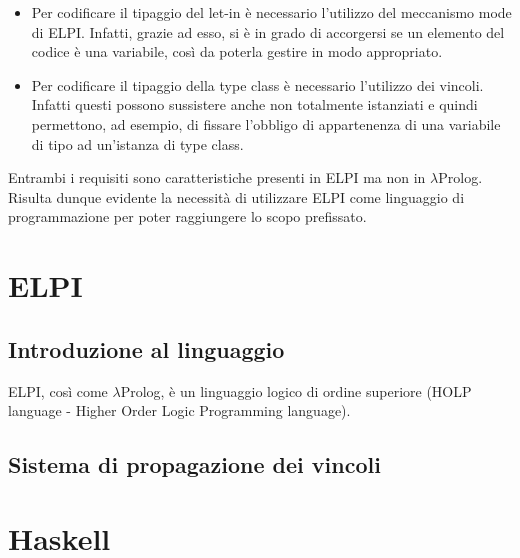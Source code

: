 \documentclass[12pt,a4paper,openright,twoside]{report}
\begin{document}
\begin{itemize}
 \item Per codificare il tipaggio del let-in è necessario l'utilizzo del meccanismo mode di ELPI. Infatti, grazie ad esso, si è in grado di accorgersi se un elemento del codice è una variabile, così da poterla gestire in modo appropriato.
 \item Per codificare il tipaggio della type class è necessario l'utilizzo dei vincoli. Infatti questi possono sussistere anche non totalmente istanziati e quindi permettono, ad esempio, di fissare l'obbligo di appartenenza di una variabile di tipo ad un'istanza di type class.
\end{itemize}
Entrambi i requisiti sono caratteristiche presenti in ELPI ma non in $\lambda$Prolog. Risulta dunque evidente la necessità di utilizzare ELPI come linguaggio di programmazione per poter raggiungere lo scopo prefissato.

\section{ELPI}
\subsection{Introduzione al linguaggio}
ELPI, così come $\lambda$Prolog, è un linguaggio logico di ordine superiore (HOLP language - Higher Order Logic Programming language).































\subsection{Sistema di propagazione dei vincoli}

\section{Haskell}
\end{document}
